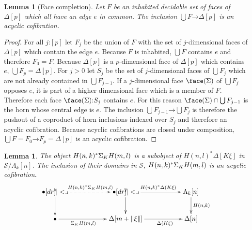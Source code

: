 \documentclass{amsart}
\theoremstyle{plain}
\newtheorem{lemma}[theorem]{Lemma}
\theoremstyle{definition}
\newcommand\cat\mathcal
\newcommand\ri{^*}
\newcommand\of{\mathord:}
\renewcommand\to{\mathord\rightarrow}
\newcommand\simplex\Delta
\newcommand\horn\Lambda
\begin{document}
\begin{lemma}[Face completion] Let $F$ be an inhabited decidable set of faces of $\simplex[p]$ which all have an edge $e$ in common. The inclusion $\bigcup F\to \simplex[p]$ is an acyclic cofibration. \label{face completion} \end{lemma}

\begin{proof} For all $j\of[p]$ let $F_j$ be the union of $F$ with the set of $j$-dimensional faces of $\simplex[p]$ which contain the edge $e$. Because $F$ is inhabited, $\bigcup F$ contains $e$ and therefore $F_0=F$. Because $\simplex[p]$ is a $p$-dimensional face of $\simplex[p]$ which contains $e$, $\bigcup F_p = \simplex[p]$. For $j>0$ let $S_j$ be the set of $j$-dimensional faces of $\bigcup F_j$ which are not already contained in $\bigcup F_{j-1}$. If a $j$-dimensional face $\face(\Sigma)$ of $\bigcup F_j$ opposes $e$, it is part of a higher dimensional face which is a member of $F$. Therefore each face $\face(\Sigma)\of S_j$ contains $e$. For this reason $\face(\Sigma)\cap \bigcup F_{j-1}$ is the horn whose central edge is $e$. The inclusion $\bigcup F_{j-1}\to\bigcup F_j$ is therefore the pushout of a coproduct of horn inclusions indexed over $S_j$ and therefore an acyclic cofibration. Because acyclic cofibrations are closed under composition, $\bigcup F = F_0\to F_p = \simplex[p]$ is an acyclic cofibration. 
\end{proof}

\begin{lemma} The object $H(n,k)\ri \depsum K H(m,l)$ is a subobject of $H(n,l)\ri\simplex[K\xi]$ in $\cat S/\horn_k[n]$. The inclusion of their domains in $\cat S$, $H(n,k)\ri \depsum K H(m,l)$ is an acyclic cofibration. \label{acyclic cofibrancy} 
\[\xymatrix{
\bullet \ar@{.>}[rr]^{H(n,k)\ri \depsum K H(m,l)} \ar[d]\pb && \bullet\ar[rr]^{H(n,k)\ri\simplex(K\xi)}\ar[d]\pb && \horn_k[n]\ar[d]^{H(n,k)}\\
\bullet\ar[rr]_(.4){\depsum K H(m,l)} && \simplex[m+\norm\xi]\ar[rr]_(.6){\simplex(K\xi)} && \simplex[n]
}\]
\end{lemma}
\end{document}
